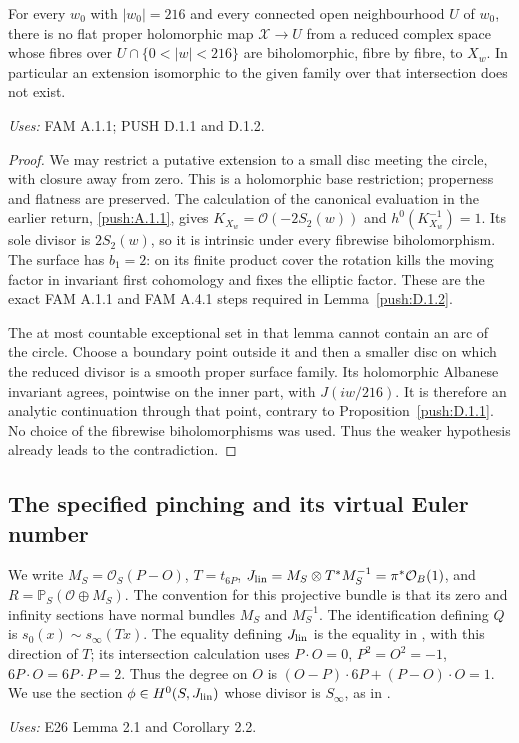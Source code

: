 \begin{theorem}[PUSH D.1.3; T]\label{push:D.1.3}
For every \(w_0\) with \(|w_0|=216\) and every connected open
neighbourhood \(U\) of \(w_0\), there is no flat proper holomorphic
map \(\mathcal X\to U\) from a reduced complex space whose fibres
over \(U\cap\{0<|w|<216\}\) are biholomorphic, fibre by fibre, to
\(X_w\). In particular an extension isomorphic to the given family
over that intersection does not exist.
\end{theorem}
\noindent\emph{Uses:} FAM A.1.1; PUSH D.1.1 and D.1.2.\par

\begin{proof}
We may restrict a putative extension to a small disc meeting the
circle, with closure away from zero. This is a holomorphic base
restriction; properness and flatness are preserved. The calculation
of the canonical evaluation in the earlier return, \ref{push:A.1.1}, gives
\(K_{X_w}=\mathcal O(-2S_2(w))\) and
\(h^0(K_{X_w}^{-1})=1\). Its sole divisor is \(2S_2(w)\), so it is
intrinsic under every fibrewise biholomorphism. The surface has
\(b_1=2\): on its finite product cover the rotation kills the moving
factor in invariant first cohomology and fixes the elliptic factor.
These are the exact FAM A.1.1 and FAM A.4.1 steps required in Lemma~\ref{push:D.1.2}.

The at most countable exceptional set in that lemma cannot contain
an arc of the circle. Choose a boundary point outside it and then a smaller disc
on which the reduced divisor is a smooth proper surface family. Its
holomorphic Albanese invariant agrees, pointwise on the inner part,
with \(J(iw/216)\). It is therefore an analytic continuation through
that point, contrary to Proposition~\ref{push:D.1.1}. No choice of the
fibrewise biholomorphisms was used. Thus the weaker hypothesis already
leads to the contradiction.
\end{proof}

\subsection{The specified pinching and its virtual Euler number}
\begin{definition}\label{push:A.1.setup}
We write $M_S=\mathcal O_S(P-O)$, $T=t_{6P}$,
$J_{\rm lin}=M_S\otimes T^*M_S^{-1}=\pi^*\mathcal O_B(1)$, and
$R=\mathbb P_S(\mathcal O\oplus M_S)$. The convention for this projective
bundle is that its zero and infinity sections have normal bundles
$M_S$ and $M_S^{-1}$. The identification defining $Q$ is
$s_0(x)\sim s_\infty(Tx)$. The equality defining $J_{\rm lin}$ is the equality
in \cite[Lemma~2.1]{E26}, with this direction of $T$; its intersection
calculation uses $P\cdot O=0$, $P^2=O^2=-1$,
$6P\cdot O=6P\cdot P=2$. Thus the degree on $O$ is
$(O-P)\cdot6P+(P-O)\cdot O=1$. We use the section
$\phi\in H^0(S,J_{\rm lin})$ whose divisor is $S_\infty$, as in \cite[Corollary~2.2]{E26}. 
\end{definition}
\noindent\emph{Uses:} E26 Lemma 2.1 and Corollary 2.2.\par

